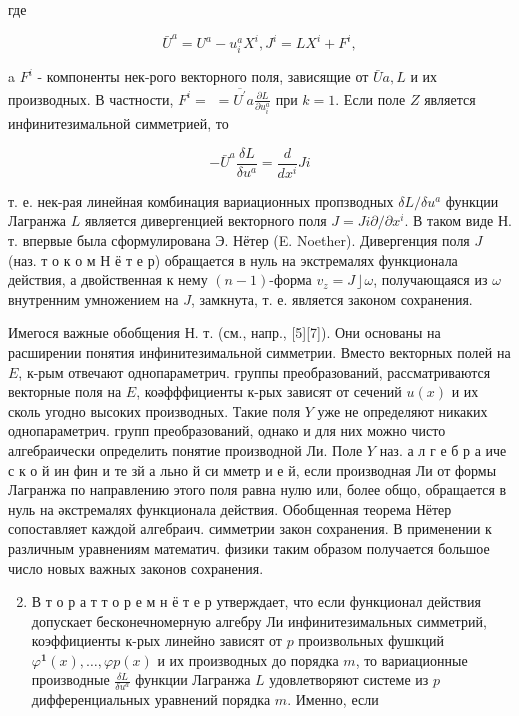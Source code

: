 \documentclass[10pt]{article}
\begin{document}
где



\[

\bar{U}^{a}=U^{a}-u_{i}^{a} X^{i}, J^{i}=L X^{i}+F^{i},

\]



a $F^{i}$ - компоненты нек-рого векторного поля, зависящие от $\bar{U} a, L$ и их производных. В частности, $F^{i}=$ $=\overline{U^{\prime}} a \frac{\partial L}{\partial u_{i}^{a}}$ при $k=1$. Если поле $Z$ является инфинитезимальной симметрией, то



\[

-\bar{U}^{a} \frac{\delta L}{\delta u^{a}}=\frac{d}{d x^{i}} J i

\]



т. е. нек-рая линейная комбинация вариационных пропзводных $\delta L / \delta u^{a}$ функции Лагранжа $L$ является дивергенцией векторного поля $J=J i \partial / \partial x^{i}$. В таком виде Н. т. впервые была сформулирована Э. Нётер (E. Noether). Дивергенция поля $J$ (наз. т о к о м Н ё т е р) обращается в нуль на экстремалях функционала действия, а двойственная к нему $(n-1)$-форма $\left.v_{z}=J\right\rfloor \omega$, получающаяся из $\omega$ внутренним умножением на $J$, замкнута, т. е. является законом сохранения.



Имегося важные обобщения Н. т. (см., напр., [5][7]). Они основаны на расширении понятия инфинитезимальной симметрии. Вместо векторных полей на $E$, к-рым отвечают однопараметрич. группы преобразований, рассматриваются векторные поля на $E$, коәфффициенты к-рых зависят от сечений $u(x)$ и их сколь угодно высоких производных. Такие поля $Y$ уже не определяют никаких однопараметрич. групп преобразований, однако и для них можно чисто алгебраически определить понятие производной Ли. Поле $Y$ наз. а л $г$ е б р а иче с к о й ин фин и те зй а льно й си мметр и е й, если производная Ли от формы Лагранжа по направлению этого поля равна нулю или, более общо, обращается в нуль на әкстремалях функционала действия. Обобщенная теорема Нётер сопоставляет каждой алгебраич. симметрии закон сохранения. В применении к различным уравнениям математич. физики таким образом получается большое число новых важных законов сохранения.



\begin{enumerate}

  \setcounter{enumi}{1}

  \item В т о р а т т о р е м н ё т е р утверждает, что если функционал действия допускает бесконечномерную алгебру Ли инфинитезимальных симметрий, коэффициенты к-рых линейно зависят от $p$ произвольных фушкций $\varphi^{\mathbf{1}}(x), \ldots, \varphi p(x)$ и их производных до порядка $m$, то вариационные производные $\frac{\delta L}{\delta u^{a}}$ функции Лагранжа $L$ удовлетворяют системе из $p$ дифференциальных уравнений порядка $m$. Именно, если

\end{enumerate}
\end{document}
